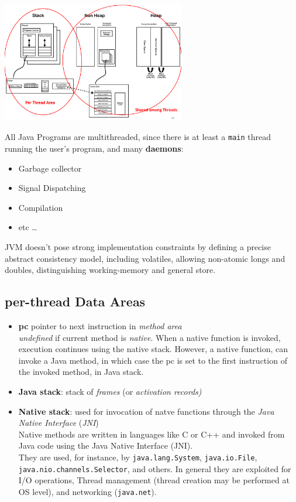 \begin{center}
    \includegraphics[width=0.6\textwidth]{images/JVM_Runtime_areas.png}
\end{center}
All Java Programs are multithreaded, since there is at least a \lstinline{main} thread running the user's program, and many \textbf{daemons}:
\begin{itemize}
    \item Garbage collector
    \item Signal Dispatching
    \item Compilation
    \item etc \dots
\end{itemize}
JVM doesn't pose strong implementation constraints by defining a precise abstract consistency model, including volatiles, allowing non-atomic longs and doubles, distinguishing working-memory and general store.


\subsection{per-thread Data Areas}
\begin{itemize}
    \item \textbf{pc} pointer to next instruction in \textit{method area}\\
    \textit{undefined }if current method is \textit{native}. When a native function is invoked, execution continues using the native stack. However, a native function, can invoke a Java method, in which case the pc is set to the first instruction of the invoked method, in Java stack.
    
    \item \textbf{Java stack}: stack of \textit{frames} (or \textit{activation records)}
    \item \textbf{Native stack}: used for invocation of natve functions through the \textit{Java Native Interface} (\textit{JNI})\\
    Native methods are written in languages like C or C++ and invoked from Java code using the Java Native Interface (JNI).\\
    They are used, for instance, by \texttt{java.lang.System}, \texttt{java.io.File}, \texttt{java.nio.channels.Selector}, and others. In general they are exploited for I/O operations, Thread management (thread creation may be performed at OS level), and networking (\texttt{java.net}).
\end{itemize}

